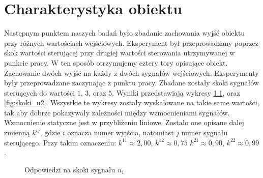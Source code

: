 \chapter{Charakterystyka obiektu}
Następnym punktem naszych badań było zbadanie zachowania wyjść obiektu przy różnych
wartościach wejściowych. Eksperyment był przeprowadzany poprzez skok wartości
sterującej przy drugiej wartości sterowania utrzymywanej w punkcie pracy.
W ten sposób otrzymujemy cztery tory opisujące obiekt. Zachowanie dwóch wyjść
na każdy z dwóch sygnałów wejściowych. Eksperymenty były przeprowadzane zaczynając
z punktu pracy. Zbadane zostały skoki sygnałów steruących do wartości $1$, $3$,
oraz $5$. Wyniki przedstawiają wykresy \ref{fig:skoki_u1}, oraz \ref{fig:skoki_u2}.
Wszystkie te wykresy zostały wyskalowane na takie same wartości, tak aby
dobrze pokazywały zależności między wzmocnieniami sygnałów. Wzmocnienie statyczne
jest w przybliżeniu liniowe. Zostało one opisane dalej zmienną $k^{ij}$, gdzie $i$ oznacza
numer wyjścia, natomiast $j$ numer sygnału sterującego. Przy takim oznaczeniu:
$k^{11} \approx 2,00$, $k^{12} \approx 0,75$ $k^{21} \approx 0,90$, $k^{22} \approx 0,99$.


\begin{figure}[tb]
\centering
{}
\caption{Odpowiedzi na skoki sygnału $u_1$}
\label{fig:skoki_u1}
\end{figure}

